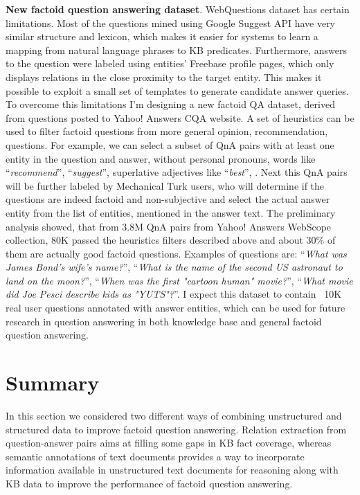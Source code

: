 \textbf{New factoid question answering dataset}.
WebQuestions dataset has certain limitations.
Most of the questions mined using Google Suggest API have very similar structure and lexicon, which makes it easier for systems to learn a mapping from natural language phrases to KB predicates.
Furthermore, answers to the question were labeled using entities' Freebase profile pages, which only displays relations in the close proximity to the target entity.
This makes it possible to exploit a small set of templates to generate candidate answer queries.
To overcome this limitations I'm designing a new factoid QA dataset, derived from questions posted to Yahoo! Answers CQA website.
A set of heuristics can be used to filter factoid questions from more general opinion, recommendation, \etc questions.
For example, we can select a subset of QnA pairs with at least one entity in the question and answer, without personal pronouns, words like ``\textit{recommend}'', ``\textit{suggest}'', superlative adjectives like ``\textit{best}'', \etc.
Next this QnA pairs will be further labeled by Mechanical Turk users, who will determine if the questions are indeed factoid and non-subjective and select the actual answer entity from the list of entities, mentioned in the answer text.
The preliminary analysis showed, that from 3.8M QnA pairs from Yahoo! Answers WebScope collection, 80K passed the heuristics filters described above and about 30\% of them are actually good factoid questions.
Examples of questions are: ``\textit{What was James Bond's wife's name?}'', ``\textit{What is the name of the second US astronaut to land on the moon?}'', ``\textit{When was the first "cartoon human" movie?}'', ``\textit{What movie did Joe Pesci describe kids as "YUTS"?}''.
I expect this dataset to contain ~10K real user questions annotated with answer entities, which can be used for future research in question answering in both knowledge base and general factoid question answering.

\section{Summary}
In this section we considered two different ways of combining unstructured and structured data to improve factoid question answering.
Relation extraction from question-answer pairs aims at filling some gaps in KB fact coverage, whereas semantic annotations of text documents provides a way to incorporate information available in unstructured text documents for reasoning along with KB data to improve the performance of factoid question answering.

